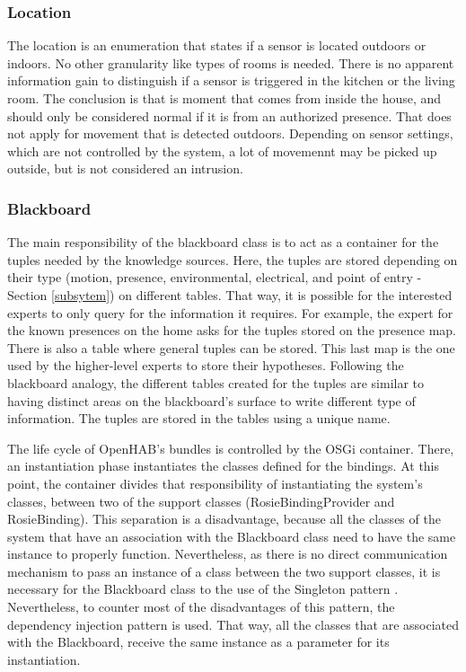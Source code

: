 \subsubsection{Location}
The location is an enumeration that states if a sensor is located outdoors or indoors. No other granularity like types of rooms is needed. There is no apparent information gain to distinguish if a sensor is triggered in the kitchen or the living room. The conclusion is that is moment that comes from inside the house, and should only be considered normal if it is from an authorized presence. That does not apply for movement that is detected outdoors. Depending on sensor settings, which are not controlled by the system, a lot of movemennt may be picked up outside, but is not considered an intrusion. 

\subsubsection{Blackboard}
The main responsibility of the blackboard class is to act as a container for the tuples needed by the knowledge sources. Here, the tuples are stored depending on their type (motion, presence, environmental, electrical, and point of entry - Section \ref{subsytem})  on different tables. That way, it is possible for the interested experts to only query for the information it requires. For example, the expert for the known presences on the home asks for the tuples stored on the presence map. There is also a table where general tuples can be stored. This last map is the one used by the higher-level experts to store their hypotheses. Following the blackboard analogy, the different tables created for the tuples are similar to having distinct areas on the blackboard's surface to write different type of information. The tuples are stored in the tables using a unique name.

The life cycle of OpenHAB's bundles is controlled by the OSGi container. There, an instantiation phase instantiates the classes defined for the bindings. At this point, the container divides that responsibility of instantiating the system's classes, between two of the support classes (RosieBindingProvider and RosieBinding). This separation is a disadvantage, because all the classes of the system that have an association with the Blackboard class need to have the same instance to properly function. Nevertheless, as there is no direct communication mechanism to pass an instance of a class between the two support classes, it is necessary for the Blackboard class to the use of the Singleton pattern \cite{Gamma:1995:DPE:186897}. Nevertheless, to counter most of the disadvantages of this pattern, the dependency injection pattern \cite{Prasanna:2009:DI:1795686} is used. That way, all the classes that are associated with the Blackboard, receive the same instance as a parameter for its instantiation.


